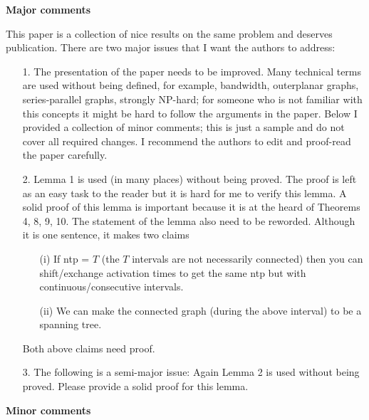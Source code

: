 \documentclass[11pt,a4paper]{article}
\begin{document}
\textbf{Major comments}

This paper is a collection of nice results on the same problem and deserves publication. There are two major issues that I want the authors to address:

\begin{itemize}

\item[1.] The presentation of the paper needs to be improved. Many technical terms are used without being defined, for example, bandwidth, outerplanar graphs, series-parallel graphs, strongly NP-hard; for someone who is not familiar with this concepts it might be hard to follow the arguments in the paper. Below I provided a collection of minor comments; this is just a sample and do not cover all required changes. I recommend the authors to edit and proof-read the paper carefully.

\item[2.] Lemma 1 is used (in many places) without being proved. The proof is left as an easy task to the reader but it is hard for me to verify this lemma. A solid proof of this lemma is important because it is at the heard of Theorems 4, 8, 9, 10.
The statement of the lemma also need to be reworded. Although it is one sentence, it makes two claims

\begin{itemize}

\item[(i)] If ntp = $T$ (the $T$ intervals are not necessarily connected) then you can shift/exchange activation times to get the same ntp but with continuous/consecutive intervals.

\item[(ii)] We can make the connected graph (during the above interval) to be a spanning tree.

\end{itemize}

Both above claims need proof.

\item[3.] The following is a semi-major issue: Again Lemma 2 is used without being proved. Please provide a solid proof for this lemma.

\end{itemize}




\textbf{Minor comments}
\end{document}
